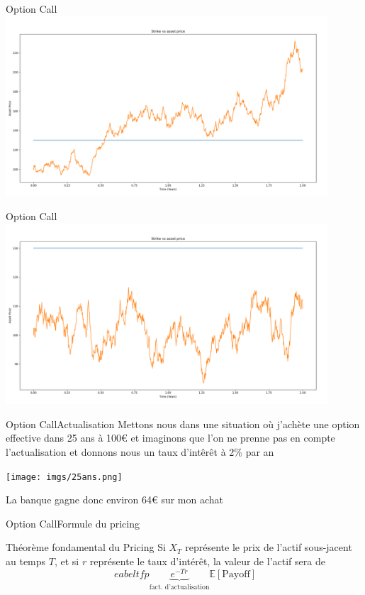 \documentclass{beamer}
\newcommand{\1}{\mathmybb{1}}
\begin{document}
\begin{frame}{Option Call}
  \includegraphics[width=12cm]{imgs/strike.png}
\end{frame}
\begin{frame}{Option Call}
  \includegraphics[width=12cm]{imgs/nostrike.png}
\end{frame}
\begin{frame}{Option Call}{Actualisation}
  Mettons nous dans une situation où j'achète une option effective dans 25 ans à 100€ et imaginons que l'on ne prenne pas en compte l'actualisation et donnons nous un taux d'intêrêt à 2\% par an
  \pause
  \begin{center}
    \texttt{[image: imgs/25ans.png]}
    \end{center}
  La banque gagne donc environ 64€ sur mon achat
\end{frame}
\begin{frame}{Option Call}{Formule du pricing}
\begin{block}{Théorème fondamental du Pricing}
    Si $X_T$  représente le prix de l'actif sous-jacent au temps $T$, et si $r$ représente le taux d'intérêt, la valeur de l'actif sera de
    \begin{equation} \
eabel{tfp}
      \underbrace{e^{-Tr}}_{\text{fact. d'actualisation}}\mathbb{E}\left[ \text{Payoff} \right]
    \end{equation}
  \end{block}
\end{frame}
\end{document}
